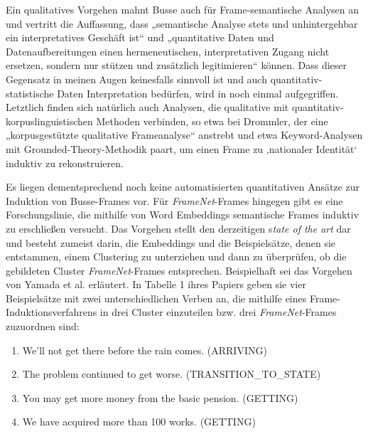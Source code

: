 Ein qualitatives Vorgehen mahnt Busse auch für Frame-semantische Analysen an und vertritt die Auffassung, dass „semantische Analyse stets und unhintergehbar ein interpretatives Geschäft ist`` und „quantitative Daten und Datenaufbereitungen einen hermeneutischen, interpretativen Zugang nicht ersetzen, sondern nur stützen und zusätzlich legitimieren`` \autocite[207]{busse33LexikFrameanalytisch2017} können. Dass dieser Gegensatz in meinen Augen keinesfalls sinnvoll ist und auch quantitativ-statistische Daten Interpretation bedürfen, wird in  noch einmal aufgegriffen. Letztlich finden sich natürlich auch Analysen, die qualitative mit quantitativ-korpuslinguistischen Methoden verbinden, so etwa bei Drommler, der eine „korpusgestützte qualitative Frameanalyse`` \autocite*[195]{drommlerNationaleIdentitaetBerliner2024} anstrebt und etwa Keyword-Analysen mit Grounded-Theory-Methodik paart, um einen Frame zu ‚nationaler Identität` induktiv zu rekonstruieren.

Es liegen dementsprechend noch keine automatisierten quantitativen Ansätze zur Induktion von Busse-Frames vor. Für \emph{FrameNet}-Frames hingegen gibt es eine Forschungslinie, die mithilfe von Word Embeddings semantische Frames induktiv zu erschließen versucht. Das Vorgehen stellt den derzeitigen s\emph{tate of the art} dar und besteht zumeist darin, die Embeddings und die Beispielsätze, denen sie entstammen, einem Clustering zu unterziehen und dann zu überprüfen, ob die gebildeten Cluster \emph{FrameNet}-Frames entsprechen. Beispielhaft sei das Vorgehen von Yamada et al. \autocite*{yamadaSemanticFrameInduction2021} erläutert. In Tabelle 1 ihres Papiers geben sie vier Beispielsätze mit zwei unterschiedlichen Verben an, die mithilfe eines Frame-Induktionsverfahrens in drei Cluster einzuteilen bzw. drei \emph{FrameNet}-Frames zuzuordnen sind:

\begin{enumerate}
  \item We'll not \textcolor[RGB]{234,151,44}{get} there before the rain comes. (\textcolor[RGB]{234,151,44}{ARRIVING})
  \item The problem continued to \textcolor[RGB]{170,181,61}{get} worse. (\textcolor[RGB]{170,181,61}{TRANSITION\_TO\_STATE})
  \item You may \textcolor[RGB]{81,137,177}{get} more money from the basic pension. (\textcolor[RGB]{81,137,177}{GETTING})
  \item We have \textcolor[RGB]{81,137,177}{acquired} more than 100 works. (\textcolor[RGB]{81,137,177}{GETTING})
\end{enumerate}

